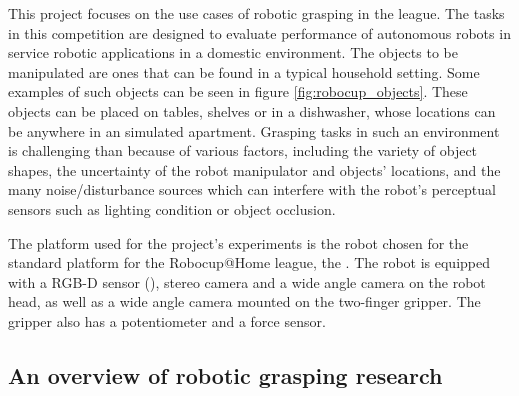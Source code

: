 This project focuses on the use cases of robotic grasping in the
 league. The tasks in this competition are designed to
evaluate performance of autonomous robots in service robotic applications in a domestic environment. The objects to be
manipulated are ones that can be found in a typical household setting. Some examples of such objects can be seen in
figure \ref{fig:robocup_objects}. These objects can be placed on tables, shelves or in a dishwasher, whose locations
can be anywhere in an simulated apartment. Grasping tasks in such an environment is challenging than because of various
factors, including the variety of object shapes, the uncertainty of the robot manipulator and objects' locations,
and the many noise/disturbance sources which can interfere with the robot's perceptual sensors such as lighting
condition or object occlusion.

The platform used for the project's experiments is the robot chosen for the standard platform for the Robocup@Home
league, the
\cite{robocupRulebook2018}. The robot is equipped with a RGB-D sensor
(), stereo camera and a wide angle camera
on the robot head, as well as a wide angle camera mounted on the two-finger gripper. The gripper also has a potentiometer
and a force sensor.

\subsection{An overview of robotic grasping research}

